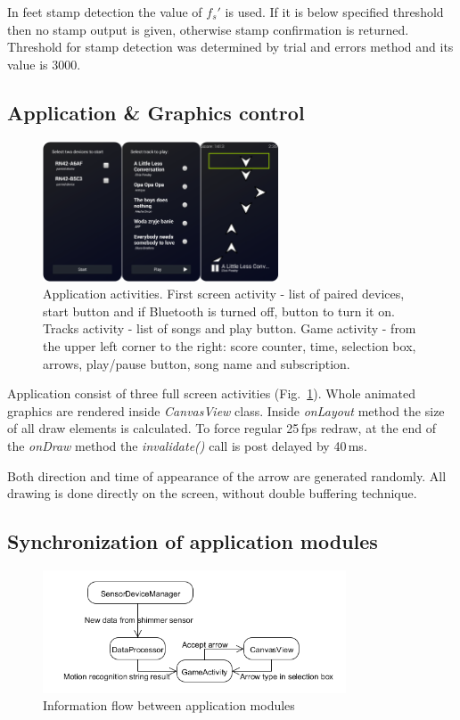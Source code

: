 \documentclass[conference]{IEEEtran}
\begin{document}
In feet stamp detection the value of $f_s'$ is used. If it is below specified threshold then no stamp output is given, otherwise stamp confirmation is returned. Threshold for stamp detection was determined by trial and errors method and its value is $3000$.


\subsection{Application \& Graphics control}

\begin{figure}[!h]
    \centering
    \includegraphics[width=7cm]{Images/Activities.png}
    \caption{Application activities. First screen activity - list of paired devices, start button and if Bluetooth is turned off, button to turn it on.
    Tracks activity - list of songs and play button.
    Game activity - from the upper left corner to the right: score counter, time, selection box, arrows, play/pause button, song name and subscription.}
    \label{fig:Activities}
\end{figure}

Application consist of three full screen activities (Fig.~\ref{fig:Activities}).
Whole animated graphics are rendered inside \emph{CanvasView} class.
Inside \emph{onLayout} method the size of all draw elements is calculated.
To force regular 25\,fps redraw, at the end of the \emph{onDraw} method the \emph{invalidate()} call is post delayed by 40\,ms.

Both direction and time of appearance of the arrow are generated randomly.
All drawing is done directly on the screen, without double buffering technique.

\subsection{Synchronization of application modules}

\begin{figure}[!h]
    \centering
    \includegraphics[width=9cm]{Images/Synchronization.png}
    \caption{Information flow between application modules}
    \label{fig:Synchronization}
\end{figure}
\end{document}
